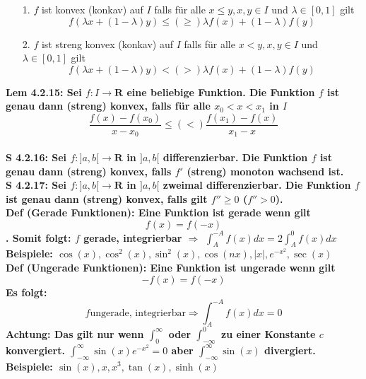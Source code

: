 \documentclass[7pt,landscape, margin = 0.1mm]{article}
\newcommand{\DEF}[2]{\color{chaptercolor}\bf{Def #1}:\color{black}    \hspace{0.2cm} #2 \\}
\newcommand{\LEM}[2]{\color{chaptercolor}\bf{Lem #1}:\color{black}    \hspace{0.2cm} #2 \\}
\newcommand{\SA}[2]{\color{chaptercolor}\bf{S #1}:\color{black}    \hspace{0.2cm} #2 \\}
\begin{document}
\begin{multicols}{4}
\begin{flushleft}
{\begin{itemize}
\item[1.] $f$ ist konvex (konkav) auf $I$ falls für alle $x \leq y, x,y\in I$ und $\lambda \in [0,1]$ gilt   
$$ f(\lambda x + (1-\lambda)y)\leq (\geq) \lambda f(x)+(1-\lambda )f(y) $$

\item[2.] $f$ ist streng konvex (konkav) auf $I$ falls für alle $x < y, x,y\in I$ und $\lambda \in [0,1]$ gilt
$$ f(\lambda x + (1-\lambda)y) < (>) \lambda f(x)+(1-\lambda )f(y) $$
 \end{itemize}}
 \LEM{4.2.15}{Sei $f: I \longrightarrow \mathbf{R}$ eine beliebige Funktion. Die Funktion $f$ ist genau dann (streng) konvex, falls für alle $x_0<x<x_1$ in $I$
$$
\frac{f(x)-f\left(x_0\right)}{x-x_0} \leq (<) \frac{f\left(x_1\right)-f(x)}{x_1-x}
$$}
\SA{4.2.16}{Sei $f:]a,b[\longrightarrow \mathbf{R}$ in $]a,b[$ differenzierbar. Die Funktion $f$ ist genau dann (streng) konvex, falls $f'$ (streng) monoton wachsend ist.}
\SA{4.2.17}{Sei $f:]a,b[\longrightarrow \mathbf{R}$ in $]a,b[$ zweimal differenzierbar. Die Funktion $f$ ist genau dann (streng) konvex, falls gilt $f''\geq 0$ ($f''>0$).}
\DEF{(Gerade Funktionen)}{ Eine Funktion ist gerade wenn gilt $$f(x) = f(-x)$$. Somit folgt: $f$ gerade, integrierbar $\Rightarrow$ $\int_{A}^{-A}f(x)dx= 2 \int_{A}^{0}f(x)dx$ 
\\Beispiele: $\cos(x), \cos^2(x), \sin^2(x) , \cos(nx), |x|, e^{-x^2}, \sec(x)$
}
\DEF{(Ungerade Funktionen)}{Eine Funktion ist ungerade wenn gilt $$-f(x) = f(-x)$$ Es folgt: $$f \text{ungerade, integrierbar}\Rightarrow \int_{A}^{-A}f(x)dx=0$$
\colorbox{yellow!30}{Achtung:}
Das gilt nur wenn $\int_{0}^{\infty}$ oder $\int_{-\infty}^{0}$ zu einer Konstante $c$ konvergiert. $\int_{-\infty}^{\infty} \sin(x)e^{-x^2} = 0$ aber $\int_{-\infty}^{\infty}\sin(x)$ divergiert.
\\Beispiele: $\sin(x), x, x^3, \tan(x), \sinh(x)$\\

}
\end{flushleft}
\end{multicols}
\end{document}
